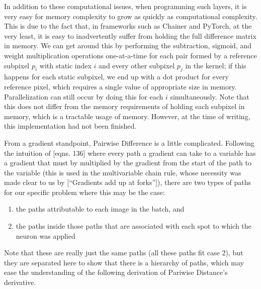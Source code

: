 In addition to these computational issues, when programming such layers, it is very easy for memory
complexity to grow as quickly as computational complexity. This is due to the fact that, in
frameworks such as Chainer\cite{tokui2019chainer} and PyTorch\cite{NEURIPS2019_9015}, at the very
least, it is easy to inadvertently suffer from holding the full difference matrix in memory. We can
get around this by performing the subtraction, sigmoid, and weight multiplication operations
one-at-a-time for each pair formed by a reference subpixel $p_i$ with static index $i$ and every
other subpixel $p_j$ in the kernel; if this happens for each static subpixel, we end up with a dot
product for every reference pixel, which requires a single value of appropriate size in memory.
Parallelization can still occur by doing this for each $i$ simultaneously. Note that this does not
differ from the memory requirements of holding each subpixel in memory, which is a tractable usage
of memory. However, at the time of writing, this implementation had not been finished.

From a gradient standpoint, Pairwise Difference is a little complicated. Following the intuition
of \cite{IMM2012-03274}[eqns. 136] where every path a gradient can take to a variable has a gradient
that must by multiplied by the gradient from the start of the path to the variable (this is used in the multivariable
chain rule, whose necessity was made clear to us by \cite{li}[``Gradients add up at forks'']), there are two
types of paths for our specific problem where this may be the case:
\begin{enumerate}
    \item the paths attributable to each image in the batch, and
    \item the paths inside those paths that are associated with each spot to which the neuron was
          applied
\end{enumerate}
Note that these are really just the same paths (all these paths fit case 2), but they are separated
here to show that there is a hierarchy of paths, which may ease the understanding of the following
derivation of Pariwise Distance's derivative.

